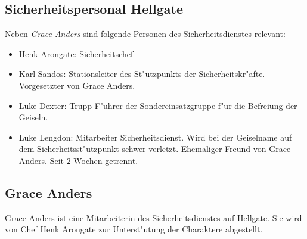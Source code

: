 \subsection{Sicherheitspersonal Hellgate}

Neben \emph{Grace Anders} sind folgende Personen des Sicherheitsdienstes relevant:

\begin{itemize}
    \item Henk Arongate: Sicherheitschef    
    \item Karl Sandos: Stationsleiter des St"utzpunkts der Sicherheitskr"afte. Vorgesetzter von Grace Anders.
    \item Luke Dexter: Trupp F"uhrer der Sondereinsatzgruppe f"ur die Befreiung der Geiseln.
    \item Luke Lengdon: Mitarbeiter Sicherheitsdienst. Wird bei der Geiselname auf dem Sicherheitsst"utzpunkt schwer verletzt. Ehemaliger Freund von Grace Anders. Seit 2 Wochen getrennt.
\end{itemize}

\newpage
\subsection{Grace Anders}

Grace Anders ist eine Mitarbeiterin des Sicherheitsdienstes auf Hellgate. Sie wird von Chef Henk Arongate zur Unterst"utung der Charaktere abgestellt. 

